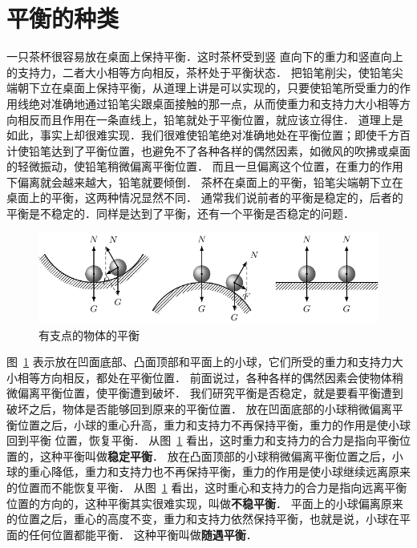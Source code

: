 \section{平衡的种类}
一只茶杯很容易放在桌面上保持平衡．这时茶杯受到竖
直向下的重力和竖直向上的支持力，二者大小相等方向相反，茶杯处于平衡状态．
把铅笔削尖，使铅笔尖端朝下立在桌面上保持平衡，从道理上讲是可以实现的，只要使铅笔所受重力的作用线绝对准确地通过铅笔尖跟桌面接触的那一点，从而使重力和支持力大小相等方向相反而且作用在一条直线上，铅笔就处于平衡位置，就应该立得住．
道理上是如此，事实上却很难实现．我们很难使铅笔绝对准确地处在平衡位置；即使千方百计使铅笔达到了平衡位置，也避免不了各种各样的偶然因素，如微风的吹拂或桌面的轻微振动，使铅笔稍微偏离平衡位置．
而且一旦偏离这个位置，在重力的作用下偏离就会越来越大，铅笔就要倾倒．
茶杯在桌面上的平衡，铅笔尖端朝下立在桌面上的平衡，这两种情况显然不同．
通常我们说前者的平衡是稳定的，后者的平衡是不稳定的．同样是达到了平衡，还有一个平衡是否稳定的问题．
\begin{figure}[htbp]
    \centering
    \includegraphics{fig/A/6-16.pdf}
    \caption{有支点的物体的平衡}\label{fig_A_6-16}
\end{figure}

图~\ref{fig_A_6-16} 表示放在凹面底部、凸面顶部和平面上的小球，它们所受的重力和支持力大小相等方向相反，都处在平衡位置．
前面说过，各种各样的偶然因素会使物体稍微偏离平衡位置，使平衡遭到破坏．
我们研究平衡是否稳定，就是要看平衡遭到破坏之后，物体是否能够回到原来的平衡位置．
放在凹面底部的小球稍微偏离平衡位置之后，小球的重心升高，重力和支持力不再保持平衡，重力的作用是使小球回到平衡
位置，恢复平衡．
从图~\ref{fig_A_6-16} 看出，这时重力和支持力的合力是指向平衡位置的，这种平衡叫做\textbf{稳定平衡}．
放在凸面顶部的小球稍微偏离平衡位置之后，小球的重心降低，重力和支持力也不再保持平衡，重力的作用是使小球继续远离原来的位置而不能恢复平衡．
从图~\ref{fig_A_6-16} 看出，这时重心和支持力的合力是指向远离平衡位置的方向的，这种平衡其实很难实现，叫做\textbf{不稳平衡}．
平面上的小球偏离原来的位置之后，重心的高度不变，重力和支持力依然保持平衡，也就是说，小球在平面的任何位置都能平衡．
这种平衡叫做\textbf{随遇平衡}．

